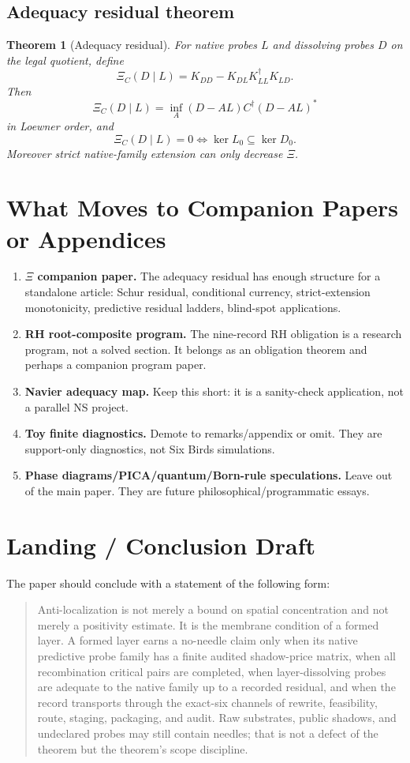 \documentclass[11pt]{article}
\newtheorem{theorem}{Theorem}
\begin{document}
\subsection{Adequacy residual theorem}
\begin{theorem}[Adequacy residual]
For native probes $L$ and dissolving probes $D$ on the legal quotient, define
\[
\Xi_C(D\mid L)=K_{DD}-K_{DL}K_{LL}^\dagger K_{LD}.
\]
Then
\[
\Xi_C(D\mid L)=\inf_A (D-AL)C^\dagger(D-AL)^*
\]
in Loewner order, and
\[
\Xi_C(D\mid L)=0\iff \ker L_0\subseteq\ker D_0.
\]
Moreover strict native-family extension can only decrease $\Xi$.
\end{theorem}

\section{What Moves to Companion Papers or Appendices}

\begin{enumerate}[label=(\alph*)]
\item \textbf{$\Xi$ companion paper.}  The adequacy residual has enough structure for a standalone article: Schur residual, conditional currency, strict-extension monotonicity, predictive residual ladders, blind-spot applications.
\item \textbf{RH root-composite program.}  The nine-record RH obligation is a research program, not a solved section.  It belongs as an obligation theorem and perhaps a companion program paper.
\item \textbf{Navier adequacy map.}  Keep this short: it is a sanity-check application, not a parallel NS project.
\item \textbf{Toy finite diagnostics.}  Demote to remarks/appendix or omit.  They are support-only diagnostics, not Six Birds simulations.
\item \textbf{Phase diagrams/PICA/quantum/Born-rule speculations.}  Leave out of the main paper.  They are future philosophical/programmatic essays.
\end{enumerate}

\section{Landing / Conclusion Draft}

The paper should conclude with a statement of the following form:

\begin{quote}
Anti-localization is not merely a bound on spatial concentration and not merely a positivity estimate.  It is the membrane condition of a formed layer.  A formed layer earns a no-needle claim only when its native predictive probe family has a finite audited shadow-price matrix, when all recombination critical pairs are completed, when layer-dissolving probes are adequate to the native family up to a recorded residual, and when the record transports through the exact-six channels of rewrite, feasibility, route, staging, packaging, and audit.  Raw substrates, public shadows, and undeclared probes may still contain needles; that is not a defect of the theorem but the theorem's scope discipline.
\end{quote}
\end{document}
